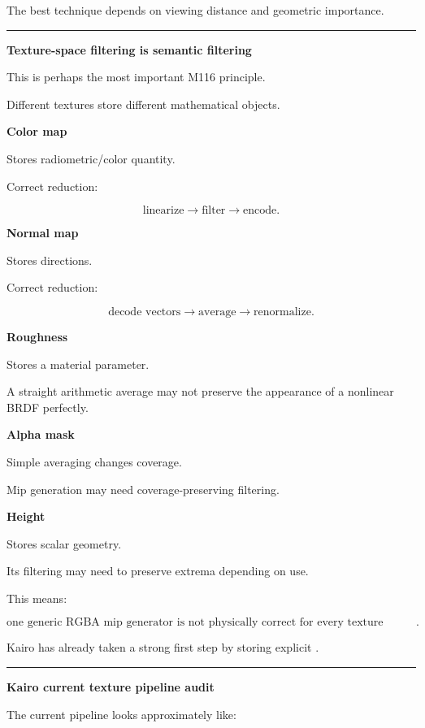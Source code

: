 The best technique depends on viewing distance and geometric importance.

\begin{center}\rule{0.5\linewidth}{0.5pt}\end{center}

\textbf{Texture-space filtering is semantic filtering}

This is perhaps the most important M116 principle.

Different textures store different mathematical objects.

\textbf{Color map}

Stores radiometric/color quantity.

Correct reduction:

\[
\text{linearize}
\rightarrow
\text{filter}
\rightarrow
\text{encode}.
\]

\textbf{Normal map}

Stores directions.

Correct reduction:

\[
\text{decode vectors}
\rightarrow
\text{average}
\rightarrow
\text{renormalize}.
\]

\textbf{Roughness}

Stores a material parameter.

A straight arithmetic average may not preserve the appearance of a nonlinear BRDF perfectly.

\textbf{Alpha mask}

Simple averaging changes coverage.

Mip generation may need coverage-preserving filtering.

\textbf{Height}

Stores scalar geometry.

Its filtering may need to preserve extrema depending on use.

This means:

\[
\boxed{
\text{one generic RGBA mip generator is not physically correct for every texture semantic}.
}
\]

Kairo has already taken a strong first step by storing explicit .

\begin{center}\rule{0.5\linewidth}{0.5pt}\end{center}

\textbf{Kairo current texture pipeline audit}

The current pipeline looks approximately like:

